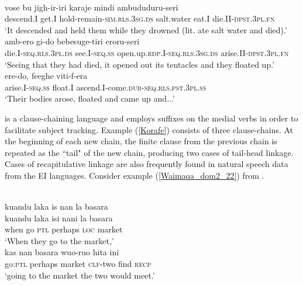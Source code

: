 \ea \label{Korafe}
\\
\ea
\gll vose bu jigh-ir-iri karaje mindi ambududuru-seri \\
descend.I get.I hold-remain-\textsc{sim}.\textsc{rls}.3\textsc{sg}.\textsc{ds} salt.water eat.I die.II-\textsc{dpst}.3\textsc{pl}.\textsc{fn} \\
\glft `It descended and held them while they drowned (lit. ate salt water and died).' \\ 
\ex
\gll amb-ero gi-do bebesuge-tiri eroru-seri \\
die.I-\textsc{seq}.\textsc{rls}.3\textsc{pl}.\textsc{ds} see.I-\textsc{seq}.\textsc{ss} open.up.\textsc{rdp}.I-\textsc{seq}.\textsc{rls}.3\textsc{sg}.\textsc{ds} arise.II-\textsc{dpst}.3\textsc{pl}.\textsc{fn} \\
\glft `Seeing that they had died, it opened out its tentacles and they floated up.' \\ 
\ex
\gll ere-do, feeghe viti-f-era \\ 
arise.I-\textsc{seq}.\textsc{ss} float.I ascend.I-come.\textsc{dur}-\textsc{seq}.\textsc{rls}.\textsc{pst}.3\textsc{pl}.\textsc{ss} \\
\glft `Their bodies arose, floated and came up and...' \\ 
\z
\z

 is a clause-chaining language and employs suffixes on the medial verbs in order to facilitate subject tracking. Example (\ref{Korafe}) consists of three clause-chains. At the beginning of each new chain, the finite clause from the previous chain is repeated as the ``tail" of the new chain, producing two cases of tail-head linkage. Cases of recapitulative linkage are also frequently found in natural speech data from the EI languages. Consider example (\ref{Waimaqa_dom2_22}) from .

\newpage
\ea \label{Waimaqa_dom2_22}
\\
\ea
\glll kuandu laka is nan la basara \\
kuandu laka isi nani la basara \\
when go \textsc{ptl} perhaps \textsc{loc} market \\
\glft `When they go to the market,' \\ 
\ex
\gll kas nan basara wuo-ruo hita ini \\ 
go:\textsc{ptl} perhaps market \textsc{clf}-two find \textsc{recp} \\
\glft `going to the market the two would meet.'\\ 
\z
\z

